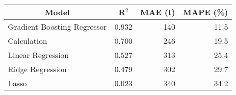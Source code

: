 
\begin{tabular}[t]{lrrr}
\toprule
\multicolumn{1}{c}{Model} & \multicolumn{1}{c}{R$^2$} & \multicolumn{1}{c}{MAE (t)} & \multicolumn{1}{c}{MAPE (\%)}\\
\midrule
Gradient Boosting Regressor & 0.932 & 140 & 11.5\\
Calculation & 0.700 & 246 & 19.5\\
Linear Regression & 0.527 & 313 & 25.4\\
Ridge Regression & 0.479 & 302 & 29.7\\
Lasso & 0.023 & 340 & 34.2\\
\bottomrule
\end{tabular}
